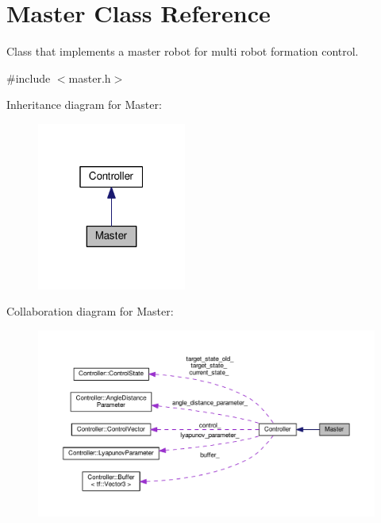 \hypertarget{classMaster}{}\section{Master Class Reference}
\label{classMaster}


Class that implements a master robot for multi robot formation control.  




{\ttfamily \#include $<$master.\+h$>$}



Inheritance diagram for Master\+:\nopagebreak
\begin{figure}[H]
\begin{center}
\leavevmode
\includegraphics[width=139pt]{classMaster__inherit__graph}
\end{center}
\end{figure}


Collaboration diagram for Master\+:\nopagebreak
\begin{figure}[H]
\begin{center}
\leavevmode
\includegraphics[width=350pt]{classMaster__coll__graph}
\end{center}
\end{figure}
